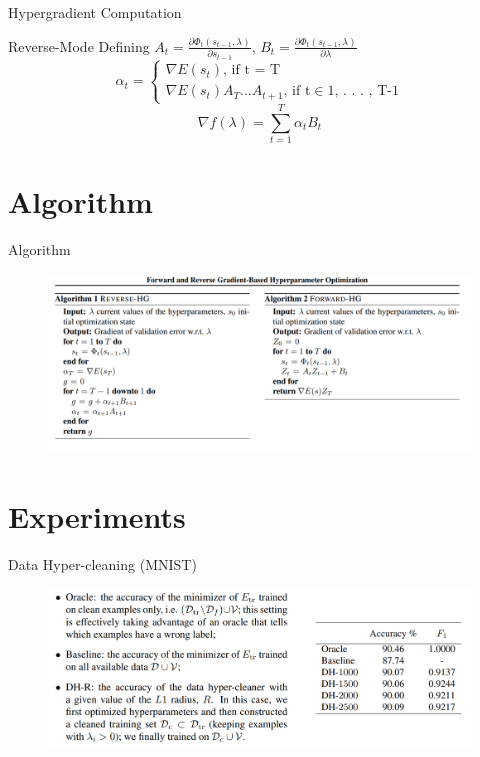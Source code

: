 \documentclass{beamer}
\begin{document}
\begin{frame}{Hypergradient Computation}
    \begin{block}{Reverse-Mode}
        Defining
        $A_{t} = \frac{\partial \Phi_{t}(s_{t-1}, \lambda)}{\partial s_{t-1}}$,
        $B_{t} = \frac{\partial \Phi_{t}(s_{t-1}, \lambda)}{\partial \lambda}$
        \begin{equation}
            \alpha_{t} = 
                \begin{cases}
                   \nabla E(s_{t}) \text{, if t = T}\\
                   \nabla E(s_{t})A_{T}...A_{t+1} \text{, if t} \in \text{{1, . . . , T-1}}
                \end{cases}
        \end{equation}
        \begin{equation}
            \nabla f(\lambda) = \sum_{t=1}^{T}\alpha_{t}B_{t}
        \end{equation}
    \end{block}
\end{frame}

\section{Algorithm}
\begin{frame}{Algorithm}
    \begin{figure}
        \centering
        \includegraphics[scale=0.4]{images/img_algorithm.png}
    \end{figure}
\end{frame}

\section{Experiments}
\begin{frame}{Data Hyper-cleaning (MNIST)}
    \begin{figure}
        \centering
        \includegraphics[scale=0.35]{images/example_1.png}
    \end{figure}
\end{frame}
\end{document}
